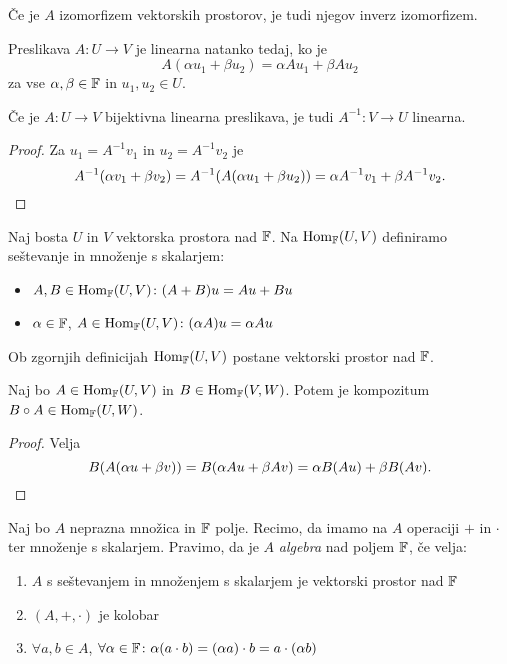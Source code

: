 \documentclass[12pt, a4paper]{article}
\begin{document}
\begin{opomba}
Če je $A$ izomorfizem vektorskih prostorov, je tudi njegov inverz izomorfizem.
\end{opomba}

\begin{trditev}
Preslikava $A\colon U\to V$ je linearna natanko tedaj, ko je
\[
A(\alpha u_1+\beta u_2)=\alpha Au_1+\beta Au_2
\]
za vse $\alpha,\beta\in\mathbb{F}$ in $u_1,u_2\in U$.
\end{trditev}

\obvs

\begin{trditev}
Če je $A\colon U\to V$ bijektivna linearna preslikava, je tudi $A^{-1}\colon V\to U$ linearna.
\end{trditev}

\begin{proof}
Za $u_1=A^{-1}v_1$ in $u_2=A^{-1}v_2$ je
\[
A^{-1}(\alpha v_1+\beta v_2)=A^{-1}(A(\alpha u_1+\beta u_2))=\alpha A^{-1}v_1+\beta A^{-1}v_2.\qedhere
\]
\end{proof}

\begin{definicija}
Naj bosta $U$ in $V$ vektorska prostora nad $\mathbb{F}$. Na $\operatorname{Hom}_{\mathbb{F}}(U,V)$ definiramo seštevanje in množenje s skalarjem:

\begin{itemize}
\item $A,B\in\operatorname{Hom}_{\mathbb{F}}(U,V)\colon (A+B)u=Au+Bu$
\item $\alpha\in\mathbb{F}$, $A\in\operatorname{Hom}_{\mathbb{F}}(U,V)\colon (\alpha A)u=\alpha Au$
\end{itemize}
\end{definicija}

\begin{trditev}
Ob zgornjih definicijah $\operatorname{Hom}_{\mathbb{F}}(U,V)$ postane vektorski prostor nad $\mathbb{F}$.
\end{trditev}

\obvs

\begin{trditev}\label{td:komp}
Naj bo $A\in\operatorname{Hom}_{\mathbb{F}}(U,V)$ in $B\in\operatorname{Hom}_{\mathbb{F}}(V,W)$. Potem je kompozitum $B\circ A\in\operatorname{Hom}_{\mathbb{F}}(U,W)$.
\end{trditev}

\begin{proof}
Velja
\[
B(A(\alpha u+\beta v))=B(\alpha Au+\beta Av)=\alpha B(Au)+\beta B(Av).\qedhere
\]
\end{proof}

\begin{definicija}
Naj bo $A$ neprazna množica in $\mathbb{F}$ polje. Recimo, da imamo na $A$ operaciji $+$ in $\cdot$ ter množenje s skalarjem. Pravimo, da je $A$ \emph{algebra} nad poljem $\mathbb{F}$, če velja:

\begin{enumerate}[label=\roman*)]
\item $A$ s seštevanjem in množenjem s skalarjem je vektorski prostor nad $\mathbb{F}$
\item $(A,+,\cdot)$ je kolobar
\item $\forall a,b\in A$, $\forall\alpha\in\mathbb{F}\colon \alpha(a\cdot b)=(\alpha a)\cdot b=a\cdot(\alpha b)$
\end{enumerate}
\end{definicija}
\end{document}
